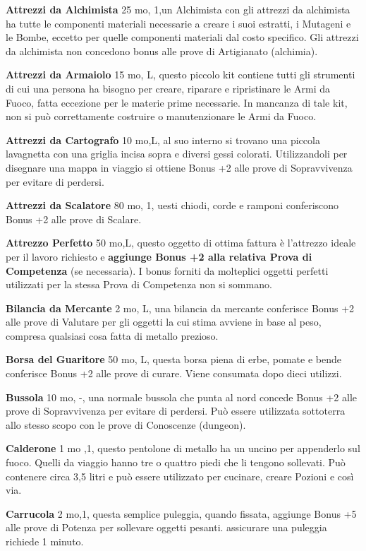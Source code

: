 \documentclass[a4paper,11pt,twoside,openany]{book}
\begin{document}
\textbf{Attrezzi da Alchimista} 25 mo, 1,un Alchimista con gli attrezzi da alchimista ha tutte le componenti materiali necessarie a creare i suoi estratti, i Mutageni e le Bombe, eccetto per quelle componenti materiali dal costo specifico. Gli attrezzi da alchimista non concedono bonus alle prove di Artigianato (alchimia).

\textbf{Attrezzi da Armaiolo} 15 mo, L, questo piccolo kit contiene tutti gli strumenti di cui una persona ha bisogno per creare, riparare e ripristinare le Armi da Fuoco, fatta eccezione per le materie prime necessarie. In mancanza di tale kit, non si può correttamente costruire o manutenzionare le Armi da Fuoco.

\textbf{Attrezzi da Cartografo} 10 mo,L, al suo interno si trovano una piccola lavagnetta con una griglia incisa sopra e diversi gessi colorati. Utilizzandoli per disegnare una mappa in viaggio si ottiene Bonus +2 alle prove di Sopravvivenza per evitare di perdersi.

\textbf{Attrezzi da Scalatore} 80 mo, 1, uesti chiodi, corde e ramponi conferiscono Bonus +2 alle prove di Scalare.

\textbf{Attrezzo Perfetto} 50 mo,L, questo oggetto di ottima fattura è l'attrezzo ideale per il lavoro richiesto e \textbf{aggiunge Bonus +2 alla relativa Prova di Competenza} (se necessaria). I bonus forniti da molteplici oggetti perfetti utilizzati per la stessa Prova di Competenza non si sommano.

\textbf{Bilancia da Mercante} 2 mo, L, una bilancia da mercante conferisce Bonus +2 alle prove di Valutare per gli oggetti la cui stima avviene in base al peso, compresa qualsiasi cosa fatta di metallo prezioso.

\textbf{Borsa del Guaritore} 50 mo, L, questa borsa piena di erbe, pomate e bende conferisce Bonus +2 alle prove di curare. Viene consumata dopo dieci utilizzi.

\textbf{Bussola} 10 mo, -, una normale bussola che punta al nord concede Bonus +2 alle prove di Sopravvivenza per evitare di perdersi. Può essere utilizzata sottoterra allo stesso scopo con le prove di Conoscenze (dungeon).

\textbf{Calderone} 1 mo ,1, questo pentolone di metallo ha un uncino per appenderlo sul fuoco. Quelli da viaggio hanno tre o quattro piedi che li tengono sollevati. Può contenere circa 3,5 litri e può essere utilizzato per cucinare, creare Pozioni e così via.

\textbf{Carrucola} 2 mo,1, questa semplice puleggia, quando fissata, aggiunge Bonus +5 alle prove di Potenza per sollevare oggetti pesanti. assicurare una puleggia richiede 1 minuto.
\end{document}
